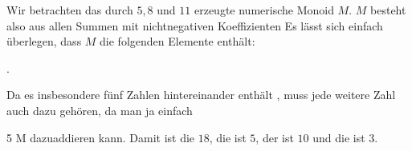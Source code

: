 {





Wir betrachten das durch $5,8$ und $11$ erzeugte numerische Monoid $M$. $M$ besteht also aus allen Summen
 mit nichtnegativen Koeffizienten
 Es lässt sich einfach überlegen, dass $M$ die folgenden Elemente enthält:

 { . }

Da es insbesondere fünf Zahlen hintereinander enthält
 {} {,}
muss jede weitere Zahl auch dazu gehören, da man ja einfach

\mavergleichskette
{\vergleichskette
{ 5
}
{ \in }{ M
}
{  }{
}
{    }{
}
{   }{
}
}
{}{}{}
dazuaddieren kann. Damit ist die
$18$, die
ist $5$, der
ist $10$ und die
ist $3$.





}





